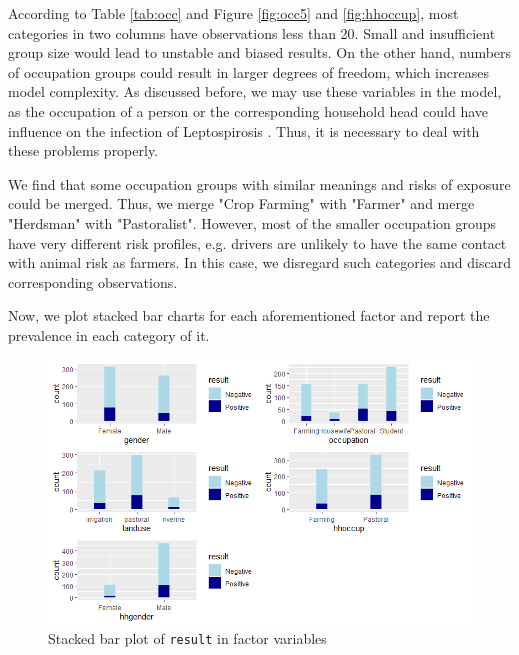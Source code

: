 \documentclass[11pt,twoside]{article}
\numberwithin{Theorem}{section}
\numberwithin{Definition}{section}
\numberwithin{Lemma}{section}
\numberwithin{Algorithm}{section}
\numberwithin{equation}{section}
\begin{document}
 According to Table \ref{tab:occ} and Figure \ref{fig:occ5} and \ref{fig:hhoccup}, most categories in two columns have observations less than 20. Small and insufficient group size would lead to unstable and  biased results. On the other hand, numbers of occupation groups could result in larger degrees of freedom, which increases model complexity. As discussed before, we may use these variables in the model, as the occupation of a person or the corresponding household head could have influence on the infection of Leptospirosis \cite{cook2017risk}. Thus, it is necessary to deal with these problems properly.

We find that some occupation groups with similar meanings and risks of exposure could be merged. Thus, we merge "Crop Farming" with "Farmer" and merge "Herdsman" with "Pastoralist". However, most of the smaller occupation groups have very different risk profiles, e.g. drivers are unlikely to have the same contact with animal risk as farmers. In this case, we disregard such categories and discard corresponding observations.

Now, we plot stacked bar charts for each aforementioned factor and report the prevalence in each category of it. 

\begin{figure}[!h]
	\centering
	\includegraphics[width = \textwidth]{Images/factors.png}
	\caption{Stacked bar plot of \texttt{result} in factor variables}
	\label{fig:factor}
\end{figure}
\end{document}
